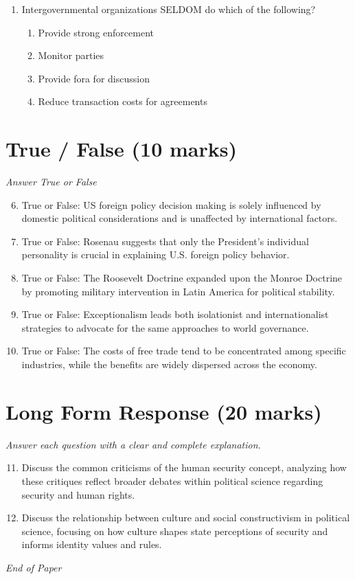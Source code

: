 \documentclass[12pt]{article}
\begin{document}
\begin{enumerate}[label=\arabic*.]
\begin{enumerate}[label=(\alph*)]
    \item Telecommunication networks
\end{enumerate}
\item Intergovernmental organizations SELDOM do which of the following?
\begin{enumerate}[label=(\alph*)]
    \item Provide strong enforcement
    \item Monitor parties
    \item Provide fora for discussion
    \item Reduce transaction costs for agreements
\end{enumerate}
\end{enumerate}

\section*{True / False (10 marks)}
\textit{Answer True or False}
\begin{enumerate}[label=\arabic*.]
\setcounter{enumi}{5}
\item True or False: US foreign policy decision making is solely influenced by domestic political considerations and is unaffected by international factors.
\item True or False: Rosenau suggests that only the President's individual personality is crucial in explaining U.S. foreign policy behavior.
\item True or False: The Roosevelt Doctrine expanded upon the Monroe Doctrine by promoting military intervention in Latin America for political stability.
\item True or False: Exceptionalism leads both isolationist and internationalist strategies to advocate for the same approaches to world governance.
\item True or False: The costs of free trade tend to be concentrated among specific industries, while the benefits are widely dispersed across the economy.
\end{enumerate}

\section*{Long Form Response (20 marks)}
\textit{Answer each question with a clear and complete explanation.}
\begin{enumerate}[label=\arabic*.]
\setcounter{enumi}{10}
\item Discuss the common criticisms of the human security concept, analyzing how these critiques reflect broader debates within political science regarding security and human rights.
\item Discuss the relationship between culture and social constructivism in political science, focusing on how culture shapes state perceptions of security and informs identity values and rules.
\end{enumerate}

\vfill
\noindent\textit{End of Paper}
\end{document}
